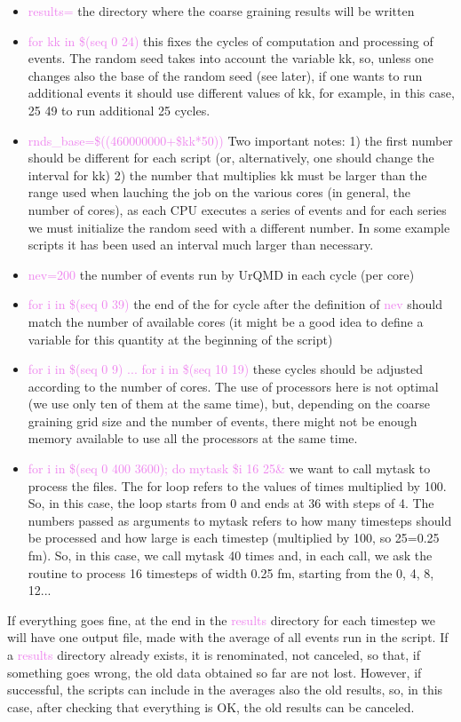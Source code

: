 \documentclass[12pt, a4paper]{article}
\begin{document}
\begin{itemize}
	\item \textcolor{Violet}{results=} the directory where the coarse graining results will be written
	\item \textcolor{Violet}{for kk in \$(seq 0 24)} this fixes the cycles of computation and processing of events. The random seed takes into account the variable kk, so, unless one changes also the base of the random seed (see later), if one wants to run additional events it should use different values of kk, for example, in this case, 25 49 to run additional 25 cycles. 
	\item \textcolor{Violet}{rnds\_base=\$((460000000+\$kk*50))} Two important notes: 1) the first number should be different for each script (or, alternatively, one should change the interval for kk) 2) the number that multiplies kk must be larger than the range used when lauching the job on the various cores (in general, the number of cores), as each CPU executes a series of events and for each series we must initialize the random seed with a different number. In some example scripts it has been used an interval much larger than necessary.
	\item \textcolor{Violet}{nev=200} the number of events run by UrQMD in each cycle (per core)
	\item \textcolor{Violet}{for i in \$(seq 0 39)} the end of the for cycle after the definition of \textcolor{Violet}{nev} should match the number of available cores (it might be a good idea to define a variable for this quantity at the beginning of the script)
	\item \textcolor{Violet}{for i in \$(seq 0 9) ... for i in \$(seq 10 19)} these cycles should be adjusted according to the number of cores. The use of processors here is not optimal (we use only ten of them at the same time), but, depending on the coarse graining grid size and the number of events, there might not be enough memory available to use all the processors at the same time. 
	\item \textcolor{Violet}{for i in \$(seq 0 400 3600); do mytask \$i 16 25\&} we want to call mytask to process the files. The for loop refers to the values of times multiplied by 100. So, in this case, the loop starts from 0 and ends at 36 with steps of 4. The numbers passed as arguments to mytask refers to how many timesteps should be processed and how large is each timestep (multiplied by 100, so 25=0.25 fm). So, in this case, we call mytask 40 times and, in each call, we ask the routine to process 16 timesteps of width 0.25 fm, starting from the 0, 4, 8, 12...     
\end{itemize}
If everything goes fine, at the end in the \textcolor{Violet}{results} directory for each timestep we will have one output file, made with the average of all events run in the script. If a \textcolor{Violet}{results} directory already exists, it is renominated, not canceled, so that, if something goes wrong, the old data obtained so far are not lost. However, if successful, the scripts can include in the averages also the old results, so, in this case, after checking that everything is OK, the old results can be canceled. 
\end{document}
